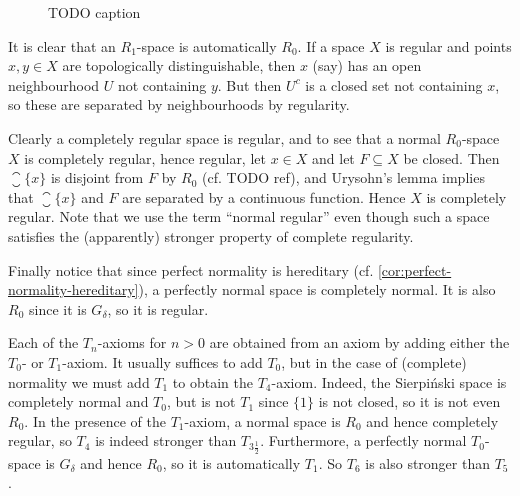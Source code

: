 \documentclass[article, a4paper, 11pt, oneside]{memoir}
\numberwithin{equation}{chapter}
\begin{document}
\begin{figure}[t]
    \caption{TODO caption}
    \label{fig:hasse}
\end{figure}

It is clear that an $R_1$-space is automatically $R_0$. If a space $X$ is regular and points $x,y \in X$ are topologically distinguishable, then $x$ (say) has an open neighbourhood $U$ not containing $y$. But then $U^c$ is a closed set not containing $x$, so these are separated by neighbourhoods by regularity.

Clearly a completely regular space is regular, and to see that a normal $R_0$-space $X$ is completely regular, hence regular, let $x \in X$ and let $F \subseteq X$ be closed. Then $\closure{\{x\}}$ is disjoint from $F$ by $R_0$ (cf. TODO ref), and Urysohn's lemma implies that $\closure{\{x\}}$ and $F$ are separated by a continuous function. Hence $X$ is completely regular. Note that we use the term \enquote{normal regular} even though such a space satisfies the (apparently) stronger property of complete regularity.

Finally notice that since perfect normality is hereditary (cf. \cref{cor:perfect-normality-hereditary}), a perfectly normal space is completely normal. It is also $R_0$ since it is $G_\delta$, so it is regular.


Each of the $T_n$-axioms for $n > 0$ are obtained from an axiom by adding either the $T_0$- or $T_1$-axiom. It usually suffices to add $T_0$, but in the case of (complete) normality we must add $T_1$ to obtain the $T_4$-axiom. Indeed, the Sierpi\'nski space is completely normal and $T_0$, but is not $T_1$ since $\{1\}$ is not closed, so it is not even $R_0$. In the presence of the $T_1$-axiom, a normal space is $R_0$ and hence completely regular, so $T_4$ is indeed stronger than $T_{3\frac{1}{2}}$. Furthermore, a perfectly normal $T_0$-space is $G_\delta$ and hence $R_0$, so it is automatically $T_1$. So $T_6$ is also stronger than $T_5$.
\end{document}
